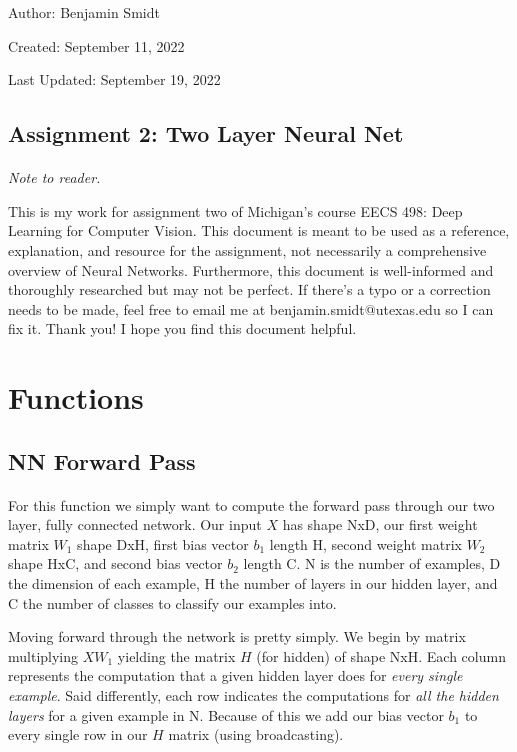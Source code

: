 \documentclass[12pt]{article}
\begin{document}
\noindent Author: Benjamin Smidt

\noindent Created: September 11, 2022

\noindent Last Updated: September 19, 2022
\begin{center}
\section*{Assignment 2: Two Layer Neural Net}
\end{center}

\paragraph{} \emph{Note to reader.} 

This is my work for assignment two of Michigan's course
EECS 498: Deep Learning for Computer Vision. This document is meant to be used as a reference, 
explanation, and resource for the assignment, not necessarily a comprehensive overview
of Neural Networks. Furthermore, this document is well-informed and thoroughly researched but
may not be perfect. If there's a typo or a correction needs to be made, feel free to 
email me at benjamin.smidt@utexas.edu so I can fix it. Thank you! I hope you find this 
document helpful.

\tableofcontents{}

\newpage

\section{Functions} 

\subsection{NN Forward Pass}
\paragraph{}
For this function we simply want to compute the forward pass through our two layer, fully connected 
network. Our input $X$ has shape NxD, our first weight matrix $W_1$ shape DxH, first 
bias vector $b_1$ length H, second weight matrix $W_2$ shape HxC, and second bias vector
$b_2$ length C. N is the number of examples, D the dimension of each example, H the number
of layers in our hidden layer, and C the number of classes to classify our examples into. 

Moving forward through the network is pretty simply. We begin by matrix multiplying 
$XW_1$ yielding the matrix $H$ (for hidden) of shape NxH. Each column represents the computation
that a given hidden layer does for \emph{every single example}. Said differently, each row
indicates the computations for \emph{all the hidden layers} for a given example in N. 
Because of this we add our bias vector $b_1$ to every single row in our $H$ matrix
(using broadcasting). 
\end{document}

